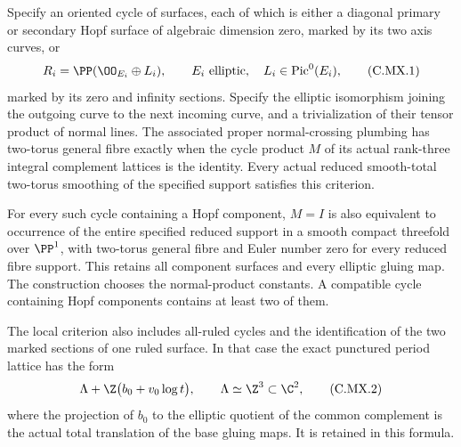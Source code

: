 
\begin{proposition}\label{cdp:st:C.2.UN.51}
Specify an oriented cycle of surfaces, each of which is either
a diagonal primary or secondary Hopf surface of algebraic dimension
zero, marked by its two axis curves, or
\[
                  R_i=\PP(\OO_{E_i}\oplus L_i),
                  \qquad E_i\ \hbox{elliptic},\quad
                         L_i\in\operatorname{Pic}^0(E_i),
                                                        \tag{C.MX.1}\label{cdp:eq:C.MX.1}
\]
marked by its zero and infinity sections. Specify the elliptic
isomorphism joining the outgoing curve to the next incoming curve,
and a trivialization of their tensor product of normal lines.
The associated proper normal-crossing plumbing has two-torus
general fibre exactly when the cycle product $M$ of its actual
rank-three integral complement lattices is the identity.
Every actual reduced smooth-total two-torus smoothing of the
specified support satisfies this criterion.

For every such cycle containing a Hopf component, $M=I$ is also
equivalent to occurrence of the entire specified reduced support
in a smooth compact threefold over $\PP^1$, with two-torus
general fibre and Euler number zero for every reduced fibre
support. This retains all component surfaces and every elliptic
gluing map. The construction chooses the normal-product constants.
A compatible cycle containing Hopf components contains at least
two of them.

The local criterion also includes all-ruled cycles and the
identification of the two marked sections of one ruled surface.
In that case the exact punctured period lattice has the form
\[
                 \Lambda+\Z\bigl(b_0+v_0\log t\bigr),
           \qquad \Lambda\simeq\Z^3\subset\C^2,          \tag{C.MX.2}\label{cdp:eq:C.MX.2}
\]
where the projection of $b_0$ to the elliptic quotient of the
common complement is the actual total translation of the base
gluing maps. It is retained in this formula.
\end{proposition}

